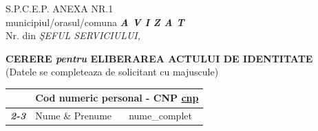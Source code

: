 \documentclass[10pt,a4paper]{article}
\newcommand{\fillline}[1][6cm]{\underline{\hspace{#1}}}
\begin{document}
\begin{flushleft}
S.P.C.E.P. \fillline[6cm] \hfill ANEXA NR.1\\
\hspace*{1cm}\footnotesize municipiul/orasul/comuna \hfill \normalsize \textbf{\textit{A V I Z A T}}\\
Nr. \fillline[3cm] din \fillline[3cm] \hfill \textit{ŞEFUL SERVICIULUI,}
\end{flushleft}

\vspace{0.3cm}

\begin{center}
{\Large\textbf{CERERE \textit{pentru} ELIBERAREA ACTULUI DE IDENTITATE}}\\
\footnotesize (Datele se completeaza de solicitant cu majuscule)
\end{center}

\vspace{0.3cm}

\begin{tabularx}{\textwidth}{|>{\bfseries\itshape}m{2.6cm}|m{3cm}|X|}
\hline
\multirow{2}{*}{Subsemnatul:} & \multicolumn{2}{l|}{Cod numeric personal - CNP \quad \underline{ {{cnp}} }} \\
\cline{2-3}
 & Nume \& Prenume & {{nume_complet}} \\
\hline
\end{tabularx}
\end{document}
